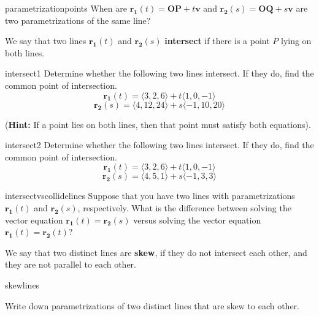 \begin{problem}{parametrizationpoints}
    When are $\bm{r_1}(t) = \bm{OP} + t\bm{v}$ and $\bm{r_2}(s) = \bm{OQ} + s\bm{v}$ are two parametrizations of the same line?
\end{problem}

\begin{definition}
We say that two lines $\bm{r_1}(t)$ and $\bm{r_2}(s)$ \textbf{intersect} if there is a point $P$ lying on both lines. 
\end{definition}



\begin{problem}{intersect1}
    Determine whether the following two lines intersect.  If they do, find the common point of intersection.
    $$\bm{r_1}(t) =   \langle3,2,6\rangle + t\langle1,0,-1\rangle$$
    $$\bm{r_2}(s) =   \langle4,12,24\rangle + s\langle-1,10,20\rangle$$
    
    (\textbf{Hint:}  If a point lies on both lines, then that point must satisfy both equations).
\end{problem}

\begin{problem}{intersect2}
    Determine whether the following two lines intersect.  If they do, find the common point of intersection.
    $$\bm{r_1}(t) =   \langle3,2,6\rangle + t\langle1,0,-1\rangle$$
    $$\bm{r_2}(s) =   \langle4,5,1\rangle + s\langle-1,3,3\rangle$$
\end{problem}

\begin{problem}{intersectvscollidelines}
    Suppose that you have two lines with parametrizations $\bm{r_1}(t)$ and $\bm{r_2}(s)$, respectively.  What is the difference between solving the vector equation $\bm{r_1}(t) = \bm{r_2}(s)$ versus solving the vector equation $\bm{r_1}(t) = \bm{r_2}(t)$?
\end{problem}

\begin{definition}
    We say that two distinct lines are \textbf{skew}, if they do not intersect each other, and they are not parallel to each other.
    \end{definition}

\begin{problem}{skewlines}
    
    Write down parametrizations of two distinct lines that are skew to each other.  
    
\end{problem}


